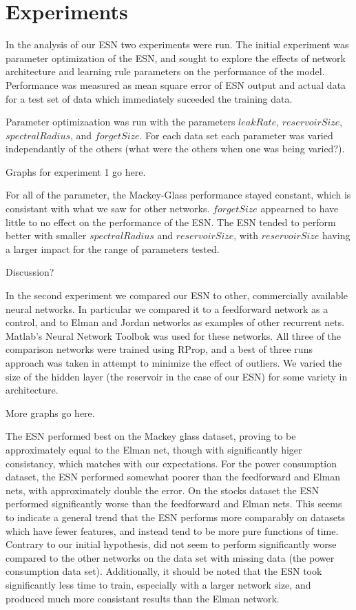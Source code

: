 \documentclass{acm_proc_article-sp}
\begin{document}
\section{Experiments}
In the analysis of our ESN two experiments were run. The initial experiment was parameter optimization of the ESN, and sought to explore the effects of network architecture and learning rule parameters on the performance of the model. Performance was measured as mean square error of ESN output and actual data for a test set of data which immediately suceeded the training data.

Parameter optimizaation was run with the parameters $leakRate$, $reservoirSize$, $spectralRadius$, and $forgetSize$. For each data set each parameter was varied independantly of the others (what were the others when one was being varied?).

Graphs for experiment 1 go here.

For all of the parameter, the Mackey-Glass performance stayed constant, which is consistant with what we saw for other networks. $forgetSize$ appearned to have little to no effect on the performance of the ESN. The ESN tended to perform better with smaller $spectralRadius$ and $reservoirSize$, with $reservoirSize$ having a larger impact for the range of parameters tested. 

Discussion?

In the second experiment we compared our ESN to other, commercially available neural networks. In particular we compared it to a feedforward network as a control, and to Elman and Jordan networks as examples of other recurrent nets. Matlab's Neural Network Toolbok was used for these networks. All three of the comparison networks were trained using RProp, and a best of three runs approach was taken in attempt to minimize the effect of outliers. We varied the size of the hidden layer (the reservoir in the case of our ESN) for some variety in architecture.

More graphs go here.

The ESN performed best on the Mackey glass dataset, proving to be approximately equal to the Elman net, though with significantly higer consistancy, which matches with our expectations. For the power consumption dataset, the ESN performed somewhat poorer than the feedforward and Elman nets, with approximately double the error. On the stocks dataset the ESN performed significantly worse than the feedforward and Elman nets. This seems to indicate a general trend that the ESN performs more comparably on datasets which have fewer features, and instead tend to be more pure functions of time. Contrary to our initial hypothesis, did not seem to perform significantly worse compared to the other networks on the data set with missing data (the power consumption data set). Additionally, it should be noted that the ESN took significantly less time to train, especially with a larger network size, and produced much more consistant results than the Elman network.
\end{document}
